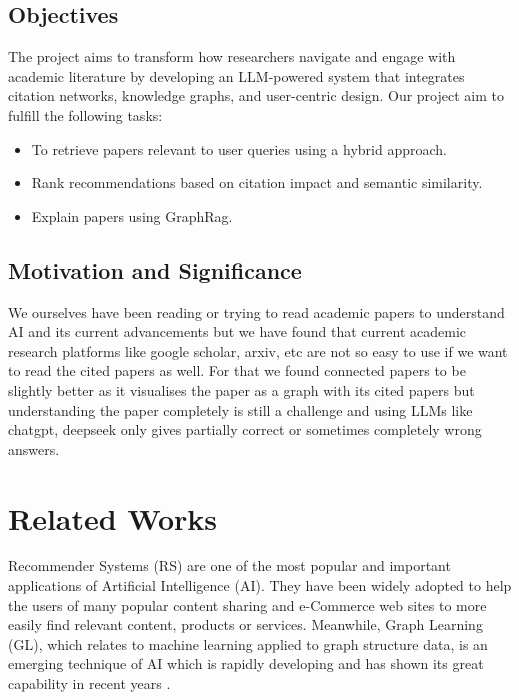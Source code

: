 \documentclass[a4paper,12pt]{article}
\begin{document}
\subsection{Objectives}
The project aims to transform how researchers navigate and engage with academic
literature by developing an LLM-powered system that integrates citation networks,
knowledge graphs, and user-centric design. Our project aim to fulfill the following tasks:
\vspace{-25pt}
\begin{itemize}
    \item To retrieve papers relevant to user queries using a hybrid approach.
    \vspace{-10pt}
    \item Rank recommendations based on citation impact and semantic similarity.
    \vspace{-10pt}
    \item Explain papers using GraphRag.
\end{itemize}

\subsection{Motivation and Significance}
We ourselves have been reading or trying to read academic papers to understand AI
and its current advancements but we have found that current academic research platforms
like google scholar, arxiv, etc are not so easy to use if we want to read the cited
papers as well. For that we found connected papers to be slightly better as it
visualises the paper as a graph with its cited papers but understanding the paper
completely is still a challenge and using LLMs like chatgpt, deepseek only gives
partially correct or sometimes completely wrong answers.
\newpage

\section{Related Works}
Recommender Systems (RS) are one of the most popular and important applications of
Artificial Intelligence (AI). They have been widely adopted to help the users of
many popular content sharing and e-Commerce web sites to more easily find relevant
content, products or services. Meanwhile, Graph Learning (GL), which relates to
machine learning applied to graph structure data, is an emerging technique of AI
which is rapidly developing and has shown its great capability in recent years
\parencite{wang2021graphlearningbasedrecommender}.
\end{document}
